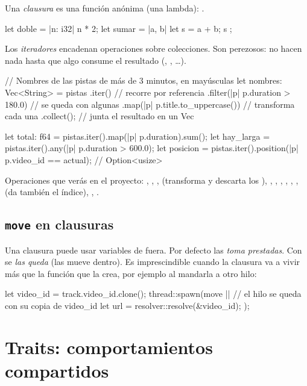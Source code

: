 Una \emph{clausura} es una función anónima (una lambda): .

\begin{rust}
let doble = |n: i32| n * 2;
let sumar = |a, b| { let s = a + b; s };
\end{rust}

Los \emph{iteradores} encadenan operaciones sobre colecciones. Son perezosos: no hacen nada
hasta que algo consume el resultado (, , …).

\begin{rust}
// Nombres de las pistas de más de 3 minutos, en mayúsculas
let nombres: Vec<String> = pistas
    .iter()                                  // recorre por referencia
    .filter(|p| p.duration > 180.0)          // se queda con algunas
    .map(|p| p.title.to_uppercase())         // transforma cada una
    .collect();                              // junta el resultado en un Vec

let total: f64 = pistas.iter().map(|p| p.duration).sum();
let hay_larga = pistas.iter().any(|p| p.duration > 600.0);
let posicion = pistas.iter().position(|p| p.video_id == actual);   // Option<usize>
\end{rust}

Operaciones que verás en el proyecto: , , ,
 (transforma y descarta los ), , ,
, , , ,  (da también el
índice), , .

\subsection{\texttt{move} en clausuras}

Una clausura puede usar variables de fuera. Por defecto las \emph{toma prestadas}. Con
 se \emph{las queda} (las mueve dentro). Es imprescindible cuando la clausura va a
vivir más que la función que la crea, por ejemplo al mandarla a otro hilo:

\begin{rust}
let video_id = track.video_id.clone();
thread::spawn(move || {            // el hilo se queda con su copia de video_id
    let url = resolver::resolve(&video_id);
});
\end{rust}

\section{Traits: comportamientos compartidos}

